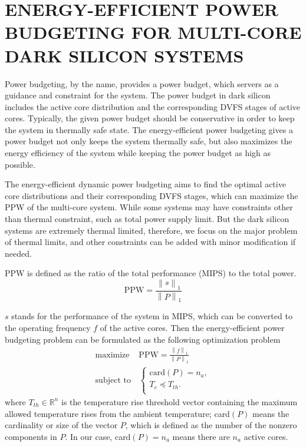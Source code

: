 \section{ENERGY-EFFICIENT POWER BUDGETING FOR MULTI-CORE DARK SILICON SYSTEMS}

Power budgeting, by the name, provides a power budget, which servers as a guidance and constraint for the system. The power budget in dark silicon includes the active core distribution and the corresponding DVFS stages of active cores. Typically, the given power budget should be conservative in order to keep the system in thermally safe state. The energy-efficient power budgeting gives a power budget not only keeps the system thermally safe, but also maximizes the energy efficiency of the system while keeping the power budget as high as possible.


The energy-efficient dynamic power budgeting aims to find the optimal active core distributions and their corresponding DVFS stages, which can maximize the PPW of the multi-core system. While some systems may have constraints other than thermal constraint, such as total power supply limit. But the dark silicon systems are extremely thermal limited, therefore, we focus on the major problem of thermal limits, and other constraints can be added with minor modification if needed.

PPW is defined as the ratio of the total performance (MIPS) to the total power.
\begin{equation}\label{eq:ppw}
\text{PPW} = \frac{\left \| s \right \|_{1}}{\left \| P \right \|_{1}}
\end{equation}

$s$ stands for the performance of the system in MIPS, which can be converted to the operating frequency $f$ of the active cores. Then the energy-efficient power budgeting problem can be formulated as the following optimization problem
\begin{equation}\label{eq:opt_ppw}
\begin{split}
\text{maximize } & \text{PPW} = \frac{\left \| f \right \|_{1}}{\left \| P \right \|_{1}}\\
\text{subject to} &\left\{
\begin{array}{lr}
\text{card}(P) = n_{a},\\
T_{c} \preceq T_{th}.\\
\end{array}
\right.
\end{split}
\end{equation}
where $T_{th} \in \mathbb{R}^{n}$ is the temperature rise threshold vector containing the maximum allowed temperature rises from the ambient temperature; card$(P)$ means the cardinality or size of the vector $P$, which is defined as the number of the nonzero components in $P$. In our case, card$(P) = n_{a}$ means there are $n_{a}$ active cores.

